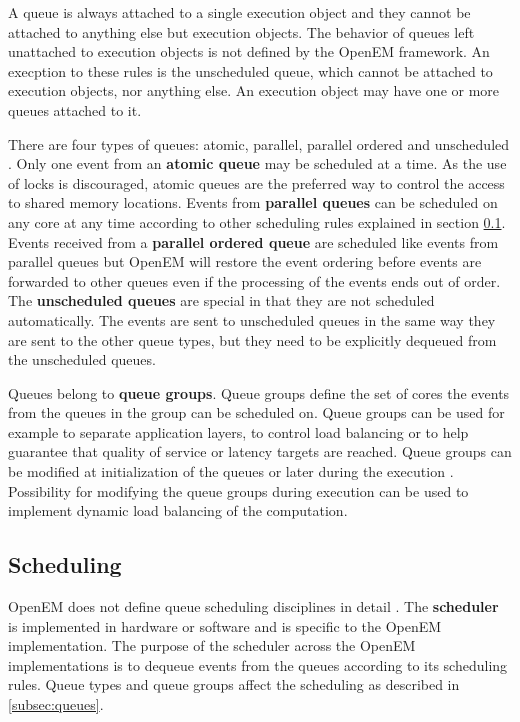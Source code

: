 A queue is always attached to a single execution object and they cannot be attached to anything else but execution objects. The behavior of queues left unattached to execution objects is not defined by the OpenEM framework. An execption to these rules is the unscheduled queue, which cannot be attached to execution objects, nor anything else. An execution object may have one or more queues attached to it.~\cite{openemintro}

There are four types of queues: atomic, parallel, parallel ordered and unscheduled \cite{openemintro}. Only one event from an \textbf{atomic queue} may be scheduled at a time. As the use of locks is discouraged, atomic queues are the preferred way to control the access to shared memory locations. Events from \textbf{parallel queues} can be scheduled on any core at any time according to other scheduling rules explained in section \ref{subsec:schedule}. Events received from a \textbf{parallel ordered queue} are scheduled like events from parallel queues but OpenEM will restore the event ordering before events are forwarded to other queues even if the processing of the events ends out of order. The \textbf{unscheduled queues} are special in that they are not scheduled automatically. The events are sent to unscheduled queues in the same way they are sent to the other queue types, but they need to be explicitly dequeued from the unscheduled queues.~\cite{openempage}

Queues belong to \textbf{queue groups}. Queue groups define the set of cores the events from the queues in the group can be scheduled on. Queue groups can be used for example to separate application layers, to control load balancing or to help guarantee that quality of service or latency targets are reached. \cite{openemintro} Queue groups can be modified at initialization of the queues or later during the execution \cite{openempage}. Possibility for modifying the queue groups during execution can be used to implement dynamic load balancing of the computation.

\subsection{Scheduling}
\label{subsec:schedule}
OpenEM does not define queue scheduling disciplines in detail \cite{openempage}. The \textbf{scheduler} is implemented in hardware or software and is specific to the OpenEM implementation. The purpose of the scheduler across the OpenEM implementations is to dequeue events from the queues according to its scheduling rules. \cite{openemintro} Queue types and queue groups affect the scheduling as described in \ref{subsec:queues}.  

